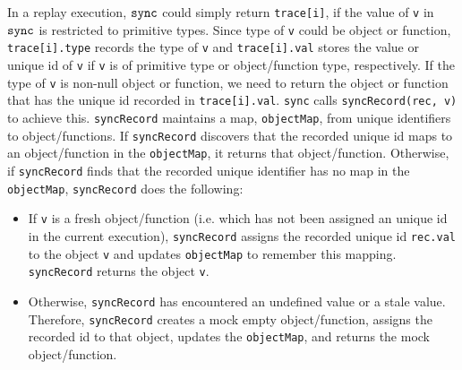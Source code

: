 \documentclass{sig-alternate}
\newcommand \dsl [1] {\ensuremath{{\tt #1}}\xspace}
\newcommand \Sync{\dsl{sync}}
\begin{document}
In a replay execution, $\Sync$ could simply return \texttt{trace[i]},
if the value of \texttt{v} in $\Sync$ is restricted to primitive
types.  Since type of \texttt{v} could be object or function,
\texttt{trace[i].type} records the type of \texttt{v} and
\texttt{trace[i].val} stores the value or unique id of \texttt{v} if
\texttt{v} is of primitive type or object/function type, respectively.
If the type of \texttt{v} is non-null object or function, we need to
return the object or function that has the unique id recorded in
\texttt{trace[i].val}.  \texttt{sync} calls \texttt{syncRecord(rec,
  v)} to achieve this.  \texttt{syncRecord} maintains a map,
\texttt{objectMap}, from unique identifiers to object/functions.  If
\texttt{syncRecord} discovers that the recorded unique id maps to an
object/function in the \texttt{objectMap}, it returns that
object/function.  Otherwise, if \texttt{syncRecord} finds that the
recorded unique identifier has no map in the \texttt{objectMap},
\texttt{syncRecord} does the following:
\begin{itemize}
\item If \texttt{v} is a fresh object/function (i.e. which has not
  been assigned an unique id in the current execution),
  \texttt{syncRecord} assigns the recorded unique id \texttt{rec.val}
  to the object \texttt{v} and updates \texttt{objectMap} to remember
  this mapping.  \texttt{syncRecord} returns the object \texttt{v}.
\item Otherwise, \texttt{syncRecord} has encountered an undefined
  value or a stale value.  Therefore, \texttt{syncRecord} creates a
  mock empty object/function, assigns the recorded id to that object,
  updates the \texttt{objectMap}, and returns the mock
  object/function.
\end{itemize}
\end{document}
